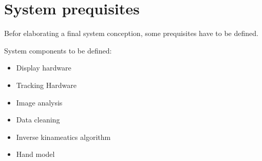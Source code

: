\chapter{System prequisites}

Befor elaborating a final system conception, some prequisites have to be defined.

System components to be defined:
\begin{itemize}
 \item Display hardware
 \item Tracking Hardware
 \item Image analysis
 \item Data cleaning
 \item Inverse kinameatics algorithm
 \item Hand model
 \end{itemize} 

